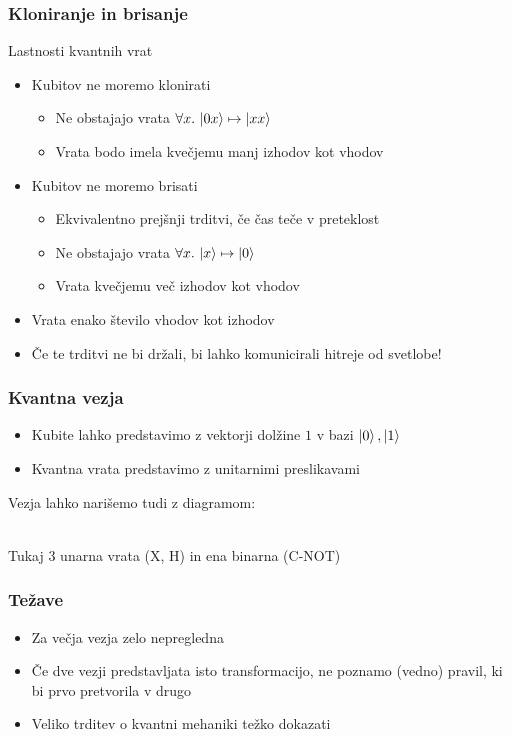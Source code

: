 \documentclass[10pt]{beamer}
\begin{document}
\begin{frame}
  \frametitle{Kloniranje in brisanje}
  Lastnosti kvantnih vrat
  \begin{itemize}
  \item Kubitov ne moremo klonirati
    \begin{itemize}
    \item Ne obstajajo vrata \(\forall x.\, \ket{0x}\mapsto\ket{xx}\)
    \item Vrata bodo imela kvečjemu manj izhodov kot vhodov
    \end{itemize}\pause
  \item Kubitov ne moremo brisati
    \begin{itemize}
    \item Ekvivalentno prejšnji trditvi, če čas teče v preteklost
    \item Ne obstajajo vrata \(\forall x.\, \ket x\mapsto\ket0\)
    \item Vrata kvečjemu več izhodov kot vhodov
    \end{itemize}\pause
  \item Vrata enako število vhodov kot izhodov
  \item Če te trditvi ne bi držali, bi lahko komunicirali hitreje od svetlobe!
  \end{itemize}
\end{frame}
\begin{frame}[fragile]
  \frametitle{Kvantna vezja}
  \begin{itemize}
  \item Kubite lahko predstavimo z vektorji dolžine \(1\) v bazi \(\ket0, \ket1\)
  \item Kvantna vrata predstavimo z unitarnimi preslikavami
  \end{itemize}
  Vezja lahko narišemo tudi z diagramom:\\
  \\
  Tukaj 3 unarna vrata (X, H) in ena binarna (C-NOT)
\end{frame}
\begin{frame}
  \frametitle{Težave}
  \pause
  \begin{itemize}
  \item Za večja vezja zelo nepregledna \pause
  \item Če dve vezji predstavljata isto transformacijo, ne poznamo (vedno) pravil, ki bi prvo pretvorila v drugo\pause
  \item Veliko trditev o kvantni mehaniki težko dokazati
  \end{itemize}
\end{frame}
\end{document}
